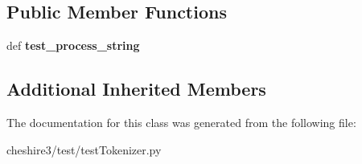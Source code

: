 \subsection*{Public Member Functions}
\begin{DoxyCompactItemize}
\item 
\hypertarget{classcheshire3_1_1test_1_1test_tokenizer_1_1_offset_tokenizer_test_case_a54df073622f116431672d8a42de3e4f5}{def {\bfseries test\-\_\-process\-\_\-string}}\label{classcheshire3_1_1test_1_1test_tokenizer_1_1_offset_tokenizer_test_case_a54df073622f116431672d8a42de3e4f5}

\end{DoxyCompactItemize}
\subsection*{Additional Inherited Members}


The documentation for this class was generated from the following file\-:\begin{DoxyCompactItemize}
\item 
cheshire3/test/test\-Tokenizer.\-py\end{DoxyCompactItemize}
